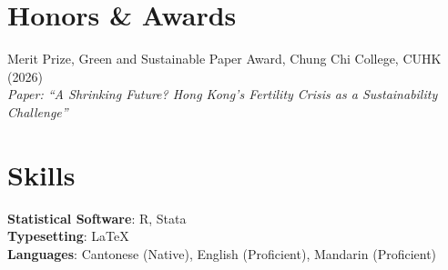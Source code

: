 \documentclass[letterpaper,11pt]{article}
\begin{document}
\section{Honors \& Awards}
 \begin{itemize}[leftmargin=0.15in, label={}]
    \small{\item{
     Merit Prize, Green and Sustainable Paper Award, Chung Chi College, CUHK (2026)\\
     \textit{Paper: ``A Shrinking Future? Hong Kong's Fertility Crisis as a Sustainability Challenge''}
    }}
 \end{itemize}

\section{Skills}
 \begin{itemize}[leftmargin=0.15in, label={}]
    \small{\item{
     \textbf{Statistical Software}{: R, Stata} \\
     \textbf{Typesetting}{: \LaTeX} \\
     \textbf{Languages}{: Cantonese (Native), English (Proficient), Mandarin (Proficient)}
    }}
 \end{itemize}
\end{document}
